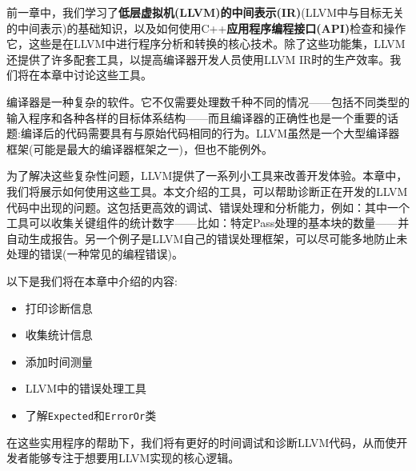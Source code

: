 前一章中，我们学习了\textbf{低层虚拟机(LLVM)的中间表示(IR)}(LLVM中与目标无关的中间表示)的基础知识，以及如何使用C++\textbf{应用程序编程接口(API)}检查和操作它，这些是在LLVM中进行程序分析和转换的核心技术。除了这些功能集，LLVM还提供了许多配套工具，以提高编译器开发人员使用LLVM IR时的生产效率。我们将在本章中讨论这些工具。

编译器是一种复杂的软件。它不仅需要处理数千种不同的情况——包括不同类型的输入程序和各种各样的目标体系结构——而且编译器的正确性也是一个重要的话题:编译后的代码需要具有与原始代码相同的行为。LLVM虽然是一个大型编译器框架(可能是最大的编译器框架之一)，但也不能例外。

为了解决这些复杂性问题，LLVM提供了一系列小工具来改善开发体验。本章中，我们将展示如何使用这些工具。本文介绍的工具，可以帮助诊断正在开发的LLVM代码中出现的问题。这包括更高效的调试、错误处理和分析能力，例如：其中一个工具可以收集关键组件的统计数字——比如：特定Pass处理的基本块的数量——并自动生成报告。另一个例子是LLVM自己的错误处理框架，可以尽可能多地防止未处理的错误(一种常见的编程错误)。

以下是我们将在本章中介绍的内容:

\begin{itemize}
\item 打印诊断信息
\item 收集统计信息
\item 添加时间测量
\item LLVM中的错误处理工具
\item 了解\texttt{Expected}和\texttt{ErrorOr}类
\end{itemize}

在这些实用程序的帮助下，我们将有更好的时间调试和诊断LLVM代码，从而使开发者能够专注于想要用LLVM实现的核心逻辑。












